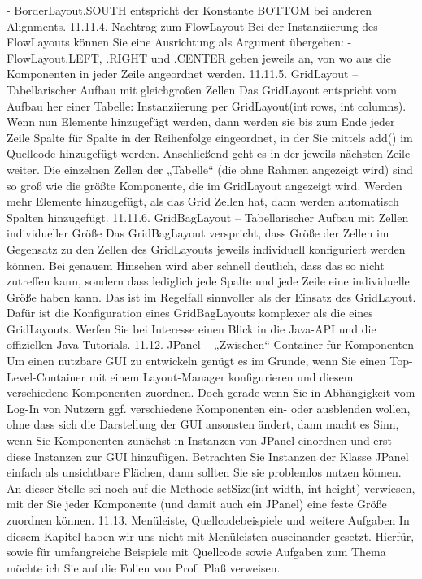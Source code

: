 -	BorderLayout.SOUTH entspricht der Konstante BOTTOM bei anderen Alignments.
11.11.4.	Nachtrag zum FlowLayout
Bei der Instanziierung des FlowLayouts können Sie eine Ausrichtung als Argument übergeben:
-	FlowLayout.LEFT, .RIGHT und .CENTER geben jeweils an, von wo aus die Komponenten in jeder Zeile angeordnet werden.
11.11.5.	GridLayout – Tabellarischer Aufbau mit gleichgroßen Zellen
Das GridLayout entspricht vom Aufbau her einer Tabelle: Instanziierung per GridLayout(int rows, int columns). Wenn nun Elemente hinzugefügt werden, dann werden sie bis zum Ende jeder Zeile Spalte für Spalte in der Reihenfolge eingeordnet, in der Sie mittels add() im Quellcode hinzugefügt werden. Anschließend geht es in der jeweils nächsten Zeile weiter. 
Die einzelnen Zellen der „Tabelle“ (die ohne Rahmen angezeigt wird) sind so groß wie die größte Komponente, die im GridLayout angezeigt wird. Werden mehr Elemente hinzugefügt, als das Grid Zellen hat, dann werden automatisch Spalten hinzugefügt.
11.11.6.	GridBagLayout – Tabellarischer Aufbau mit Zellen individueller Größe
Das GridBagLayout verspricht, dass Größe der Zellen im Gegensatz zu den Zellen des GridLayouts jeweils individuell konfiguriert werden können. Bei genauem Hinsehen wird aber schnell deutlich, dass das so nicht zutreffen kann, sondern dass lediglich jede Spalte und jede Zeile eine individuelle Größe haben kann. Das ist im Regelfall sinnvoller als der Einsatz des GridLayout. Dafür ist die Konfiguration eines GridBagLayouts komplexer als die eines GridLayouts. Werfen Sie bei Interesse einen Blick in die Java-API und die offiziellen Java-Tutorials.
11.12.	JPanel – „Zwischen“-Container für Komponenten
Um einen nutzbare GUI zu entwickeln genügt es im Grunde, wenn Sie einen Top-Level-Container mit einem Layout-Manager konfigurieren und diesem verschiedene Komponenten zuordnen. Doch gerade wenn Sie in Abhängigkeit vom Log-In von Nutzern ggf. verschiedene Komponenten ein- oder ausblenden wollen, ohne dass sich die Darstellung der GUI ansonsten ändert, dann macht es Sinn, wenn Sie Komponenten zunächst in Instanzen von JPanel einordnen und erst diese Instanzen zur GUI hinzufügen. Betrachten Sie Instanzen der Klasse JPanel einfach als unsichtbare Flächen, dann sollten Sie sie problemlos nutzen können.
An dieser Stelle sei noch auf die Methode setSize(int width, int height) verwiesen, mit der Sie jeder Komponente (und damit auch ein JPanel) eine feste Größe zuordnen können.
11.13.	Menüleiste, Quellcodebeispiele und weitere Aufgaben
In diesem Kapitel haben wir uns nicht mit Menüleisten auseinander gesetzt. Hierfür, sowie für umfangreiche Beispiele mit Quellcode sowie Aufgaben zum Thema möchte ich Sie auf die Folien von Prof. Plaß verweisen.
